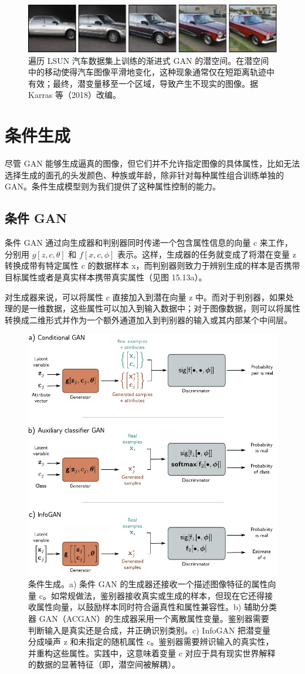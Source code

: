 \documentclass[lang=cn,newtx,10pt,scheme=chinese]{elegantbook}
\begin{document}
\begin{figure}[ht!]
\centering
\includegraphics[width=0.7\linewidth]{PDFFigures/UDLChap15PDF/GANProgressiveInterp.pdf}
\caption{遍历 LSUN 汽车数据集上训练的渐进式 GAN 的潜空间。在潜空间中的移动使得汽车图像平滑地变化，这种现象通常仅在短距离轨迹中有效；最终，潜变量移至一个区域，导致产生不现实的图像。据 Karras 等（2018）改编。}
\end{figure}

\section{条件生成}
尽管 GAN 能够生成逼真的图像，但它们并不允许指定图像的具体属性，比如无法选择生成的面孔的头发颜色、种族或年龄，除非针对每种属性组合训练单独的 GAN。条件生成模型则为我们提供了这种属性控制的能力。
\subsection{条件 GAN}
条件 GAN 通过向生成器和判别器同时传递一个包含属性信息的向量 c 来工作，分别用 \(g[z, c, \theta]\) 和 \(f[x, c, \phi]\) 表示。这样，生成器的任务就变成了将潜在变量 z 转换成带有特定属性 c 的数据样本 x，而判别器则致力于辨别生成的样本是否携带目标属性或者是真实样本携带真实属性（见图 15.13a）。

对生成器来说，可以将属性 c 直接加入到潜在向量 z 中。而对于判别器，如果处理的是一维数据，这些属性可以加入到输入数据中；对于图像数据，则可以将属性转换成二维形式并作为一个额外通道加入到判别器的输入或其内部某个中间层。

\begin{figure}[ht!]
\centering
\includegraphics[width=0.7\linewidth]{PDFFigures/UDLChap15PDF/GanConditional.pdf}
\caption{条件生成。a) 条件 GAN 的生成器还接收一个描述图像特征的属性向量 c。如常规做法，鉴别器接收真实或生成的样本，但现在它还得接收属性向量，以鼓励样本同时符合逼真性和属性兼容性。b) 辅助分类器 GAN（ACGAN）的生成器采用一个离散属性变量。鉴别器需要判断输入是真实还是合成，并正确识别类别。c) InfoGAN 把潜变量分成噪声 z 和未指定的随机属性 c。鉴别器需要辨识输入的真实性，并重构这些属性。实践中，这意味着变量 c 对应于具有现实世界解释的数据的显著特征（即，潜空间被解耦）。}
\end{figure}
\end{document}
